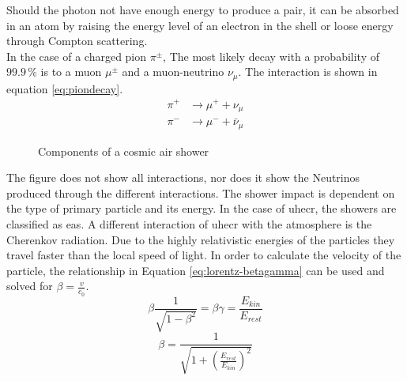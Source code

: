 \documentclass[abstract,toc,los,lof,english,10pt,glossary,acronyms]{jluthesis}
\begin{document}
Should the photon not have enough energy to produce a pair, it can be absorbed in an atom by raising the energy level of an electron in the shell or loose energy through Compton scattering.\\
In the case of a charged pion $\pi^\pm$, The most likely decay with a probability of $99.9\,\%$ is to a muon $\mu^\pm$ and a muon-neutrino $\nu_\mu$. The interaction is shown in equation \ref{eq:piondecay}.
\begin{equation}\label{eq:piondecay}
	\begin{aligned}
		\pi^+ &\rightarrow \mu^+ + \nu_\mu \\
		\pi^- &\rightarrow \mu^- + \bar{\nu}_\mu
	\end{aligned}
\end{equation}
\begin{figure}[ht!]
	\centering
	\caption{Components of a cosmic air shower}
	\label{fig:shower-components}
\end{figure}
The figure does not show all interactions, nor does it show the Neutrinos produced through the different interactions.
The shower impact is dependent on the type of primary particle and its energy. In the case of \acrshort{uhecr}, the showers are classified as \acrfull{eas}.
\clearpage
A different interaction of \acrshort{uhecr} with the atmosphere is the Cherenkov radiation. Due to the highly relativistic energies of the particles they travel faster than the local speed of light. In order to calculate the velocity of the particle, the relationship in Equation \ref{eq:lorentz-betagamma} can be used and solved for $\beta=\frac{v}{c_0}$.
\begin{equation} \label{eq:lorentz-betagamma}
	\beta\frac{1}{\sqrt{1 - \beta^2}} = \beta\gamma = \frac{E_{kin}}{E_{rest}}
\end{equation}
\begin{equation}
	\beta=\frac{1}{\sqrt{1 + \left(\frac{E_{rest}}{E_{kin}}\right)^2}}
\end{equation}
\end{document}
